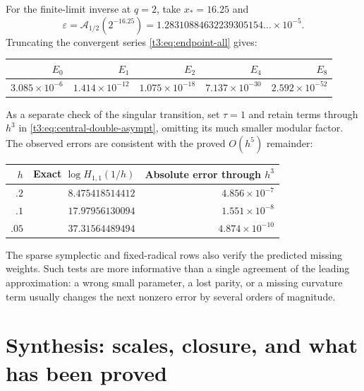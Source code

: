 \documentclass[11pt,openany]{book}
\numberwithin{equation}{chapter}
\theoremstyle{plain}
\theoremstyle{definition}
\theoremstyle{remark}
\newcommand{\eps}{\varepsilon}
\begin{document}
For the finite-limit inverse at $q=2$, take $x_*=16.25$ and
\[
 \eps=\mathcal A_{1/2}(2^{-16.25})
      =1.28310884632239305154\ldots\times10^{-5}.
\]
Truncating the convergent series \eqref{t3:eq:endpoint-all} gives:
\begin{center}
\begin{tabular}{@{}rrrrr@{}}
\toprule
$E_0$ & $E_1$ & $E_2$ & $E_4$ & $E_8$\\
\midrule
$3.085\times10^{-6}$ & $1.414\times10^{-12}$ & $1.075\times10^{-18}$ & $7.137\times10^{-30}$ & $2.592\times10^{-52}$ \\
\bottomrule
\end{tabular}
\end{center}

As a separate check of the singular transition, set $\tau=1$ and retain
terms through $h^3$ in \eqref{t3:eq:central-double-asympt}, omitting its much
smaller modular factor. The observed errors are consistent with the proved
$O(h^5)$ remainder:
\begin{center}
\begin{tabular}{@{}rrr@{}}
\toprule
$h$ & Exact $\log H_{1,1}(1/h)$ & Absolute error through $h^3$\\
\midrule
$.2$ & $8.475418514412$ & $4.856\times10^{-7}$ \\
$.1$ & $17.97956130094$ & $1.551\times10^{-8}$ \\
$.05$ & $37.31564489494$ & $4.874\times10^{-10}$ \\
\bottomrule
\end{tabular}
\end{center}

The sparse symplectic and fixed-radical rows also verify the predicted missing
weights. Such tests are more informative than a single agreement of the
leading approximation: a wrong small parameter, a lost parity, or a missing
curvature term usually changes the next nonzero error by several orders of
magnitude.

\chapter{Synthesis: scales, closure, and what has been proved}
\label{ct:ch:synthesis}
\end{document}
